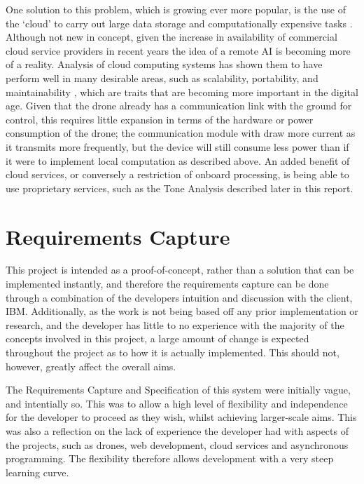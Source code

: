 \documentclass{article}
\begin{document}
One solution to this problem, which is growing ever more popular, is the use of the `cloud' to carry out large data storage and computationally expensive tasks \cite{CloudRobotics}. Although not new in concept, given the increase in availability of commercial cloud service providers in recent years the idea of a remote AI is becoming more of a reality. Analysis of cloud computing systems has shown them to have perform well in many desirable areas, such as scalability, portability, and maintainability \cite{SoftwareArchitecture}, which are traits that are becoming more important in the digital age. Given that the drone already has a communication link with the ground for control, this requires little expansion in terms of the hardware or power consumption of the drone; the communication module with draw more current as it transmits more frequently, but the device will still consume less power than if it were to implement local computation as described above. An added benefit of cloud services, or conversely a restriction of onboard processing, is being able to use proprietary services, such as the Tone Analysis described later in this report.




\section{Requirements Capture}
This project is intended as a proof-of-concept, rather than a solution that can be implemented instantly, and therefore the requirements capture can be done through a combination of the developers intuition and discussion with the client, IBM. Additionally, as the work is not being based off any prior implementation or research, and the developer has little to no experience with the majority of the concepts involved in this project, a large amount of change is expected throughout the project as to how it is actually implemented. This should not, however, greatly affect the overall aims.

The Requirements Capture and Specification of this system were initially vague, and intentially so. This was to allow a high level of flexibility and independence for the developer to proceed as they wish, whilst achieving larger-scale aims. This was also a reflection on the lack of experience the developer had with aspects of the projects, such as drones, web development, cloud services and asynchronous programming. The flexibility therefore allows development with a very steep learning curve.
\end{document}
